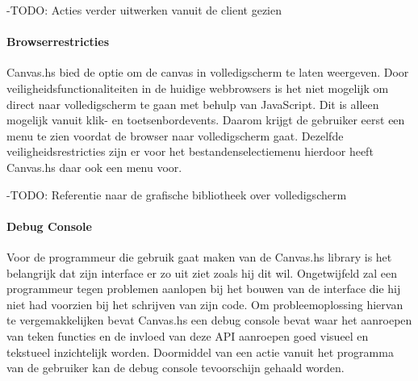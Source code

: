 -TODO: Acties verder uitwerken vanuit de client gezien
\paragraph{Browserrestricties}
Canvas.hs bied de optie om de canvas in volledigscherm te laten weergeven. Door veiligheidsfunctionaliteiten in de huidige webbrowsers is het niet mogelijk om direct naar volledigscherm te gaan met behulp van JavaScript. Dit is alleen mogelijk vanuit klik- en toetsenbordevents. Daarom krijgt de gebruiker eerst een menu te zien voordat de browser naar volledigscherm gaat. Dezelfde veiligheidsrestricties zijn er voor het bestandenselectiemenu hierdoor heeft Canvas.hs daar ook een menu voor.

-TODO: Referentie naar de grafische bibliotheek over volledigscherm

\paragraph{Debug Console}
Voor de programmeur die gebruik gaat maken van de Canvas.hs library is het belangrijk dat zijn interface er zo uit ziet zoals hij dit wil. Ongetwijfeld zal een programmeur tegen problemen aanlopen bij het bouwen van de interface die hij niet had voorzien bij het schrijven van zijn code. Om probleemoplossing hiervan te vergemakkelijken bevat Canvas.hs een debug console bevat waar het aanroepen van teken functies en de invloed van deze API aanroepen goed visueel en tekstueel inzichtelijk worden. Doormiddel van een actie vanuit het programma van de gebruiker kan de debug console tevoorschijn gehaald worden.